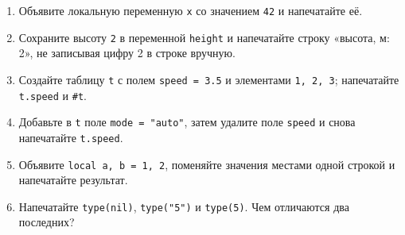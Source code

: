 \begin{taskbox}
\begin{enumerate}
  \item Объявите локальную переменную \verb|x| со значением \verb|42| и напечатайте её.
  \item Сохраните высоту \verb|2| в переменной \verb|height| и напечатайте строку «высота, м: 2», не записывая цифру 2 в строке вручную.
  \item Создайте таблицу \verb|t| с полем \verb|speed = 3.5| и элементами \verb|1, 2, 3|; напечатайте \verb|t.speed| и \verb|#t|.
  \item Добавьте в \verb|t| поле \verb|mode = "auto"|, затем удалите поле \verb|speed| и снова напечатайте \verb|t.speed|.
  \item Объявите \verb|local a, b = 1, 2|, поменяйте значения местами одной строкой и напечатайте результат.
  \item Напечатайте \verb|type(nil)|, \verb|type("5")| и \verb|type(5)|. Чем отличаются два последних?
\end{enumerate}
\end{taskbox}
